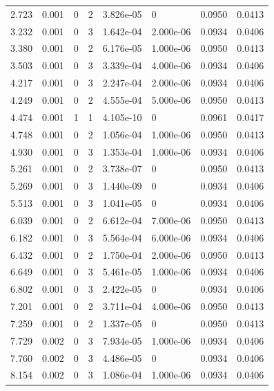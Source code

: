 \documentclass[preview]{standalone}
\begin{document}
{{\begin{tabular}{L{1.2cm}C{1.2cm} C{0.3cm}C{0.5cm} C{1.4cm}C{1.4cm} C{1.4cm}C{1.4cm}}
  2.723  &  0.001  & 0     &  2 &  3.826e-05  & 0  & 0.0950 &  0.0413   \\ 
  3.232  &  0.001  & 0     &  3 &  1.642e-04  & 2.000e-06  & 0.0934 &  0.0406   \\ 
  3.380  &  0.001  & 0     &  2 &  6.176e-05  & 1.000e-06  & 0.0950 &  0.0413   \\ 
  3.503  &  0.001  & 0     &  3 &  3.339e-04  & 4.000e-06  & 0.0934 &  0.0406   \\ 
  4.217  &  0.001  & 0     &  3 &  2.247e-04  & 2.000e-06  & 0.0934 &  0.0406   \\ 
  4.249  &  0.001  & 0     &  2 &  4.555e-04  & 5.000e-06  & 0.0950 &  0.0413   \\ 
  4.474  &  0.001  & 1     &  1 &  4.105e-10  & 0  & 0.0961 &  0.0417   \\ 
  4.748  &  0.001  & 0     &  2 &  1.056e-04  & 1.000e-06  & 0.0950 &  0.0413   \\ 
  4.930  &  0.001  & 0     &  3 &  1.353e-04  & 1.000e-06  & 0.0934 &  0.0406   \\ 
  5.261  &  0.001  & 0     &  2 &  3.738e-07  & 0  & 0.0950 &  0.0413   \\ 
  5.269  &  0.001  & 0     &  3 &  1.440e-09  & 0  & 0.0934 &  0.0406   \\ 
  5.513  &  0.001  & 0     &  3 &  1.041e-05  & 0  & 0.0934 &  0.0406   \\ 
  6.039  &  0.001  & 0     &  2 &  6.612e-04  & 7.000e-06  & 0.0950 &  0.0413   \\ 
  6.182  &  0.001  & 0     &  3 &  5.564e-04  & 6.000e-06  & 0.0934 &  0.0406   \\ 
  6.432  &  0.001  & 0     &  2 &  1.750e-04  & 2.000e-06  & 0.0950 &  0.0413   \\ 
  6.649  &  0.001  & 0     &  3 &  5.461e-05  & 1.000e-06  & 0.0934 &  0.0406   \\ 
  6.802  &  0.001  & 0     &  3 &  2.422e-05  & 0  & 0.0934 &  0.0406   \\ 
  7.201  &  0.001  & 0     &  2 &  3.711e-04  & 4.000e-06  & 0.0950 &  0.0413   \\ 
  7.259  &  0.001  & 0     &  2 &  1.337e-05  & 0  & 0.0950 &  0.0413   \\ 
  7.729  &  0.002  & 0     &  3 &  7.934e-05  & 1.000e-06  & 0.0934 &  0.0406   \\ 
  7.760  &  0.002  & 0     &  3 &  4.486e-05  & 0  & 0.0934 &  0.0406   \\ 
  8.154  &  0.002  & 0     &  3 &  1.086e-04  & 1.000e-06  & 0.0934 &  0.0406   \\ 

\end{tabular}}}
\end{document}
